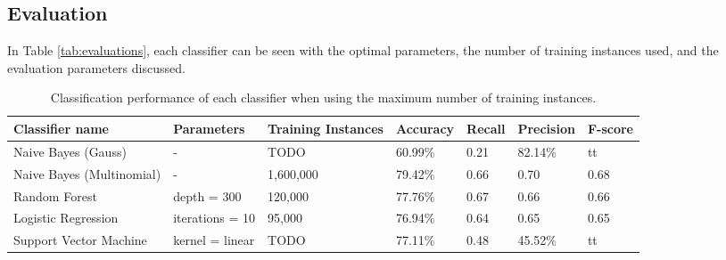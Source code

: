 \subsection{Evaluation}
In Table \ref{tab:evaluations}, each classifier can be seen with the optimal parameters, the number of training instances used, and the evaluation parameters discussed.
\begin{table}[]
\centering
\caption{Classification performance of each classifier when using the maximum number of training instances.}
\begin{tabular}{ |p{3cm}||p{3cm}|p{2cm}|p{1.5cm}|p{1.5cm}|p{1.5cm}|p{1.5cm}| }
 \hline
 Classifier name &          Parameters &             Training Instances &    Accuracy &      Recall &     Precision& F-score \\
 \hline
 Naive Bayes (Gauss)        &-&            TODO&                 60.99\%&        0.21&       82.14\%& tt\\
  \hline
 Naive Bayes (Multinomial)  &-&                     1,600,000&                79.42\%&        0.66&       0.70& 0.68\\
  \hline
 Random Forest              &depth = 300&            120,000&                 77.76\%&        0.67&       0.66& 0.66\\
  \hline
 Logistic Regression        &iterations = 10&            95,000&                 76.94\%&        0.64&       0.65& 0.65\\
  \hline
 Support Vector Machine     &kernel = linear&            TODO&                 77.11\%&        0.48&       45.52\%& tt\\
 \hline
\end{tabular}
\label{tab:evaluations_max}
\end{table}


